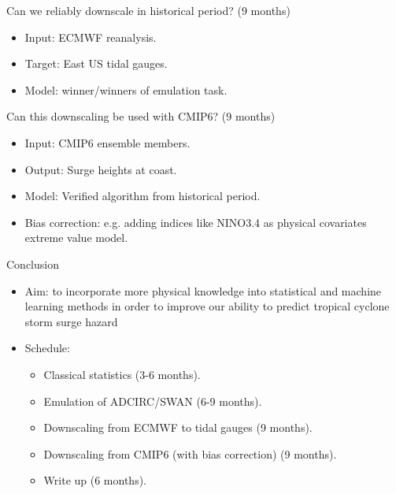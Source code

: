 \begin{frame}{Can we reliably downscale in historical period? (9 months)}

    \vspace{120pt}
\Large
\begin{itemize}
    \item Input: ECMWF reanalysis.
    \item Target: East US tidal gauges.
    \item Model: winner/winners of emulation task.
\end{itemize}
\end{frame}

\begin{frame}{Can this downscaling be used with CMIP6? (9 months)}

    \vspace{120pt}
\Large
    \begin{itemize}
    \item Input: CMIP6 ensemble members.
    \item Output: Surge heights at coast.
    \item Model: Verified algorithm from historical period.
    \item Bias correction: e.g. adding indices like NINO3.4 as physical covariates extreme value model.
    \end{itemize}
\end{frame}

\begin{frame}{Conclusion}
\Large
    \begin{itemize}
        \item Aim: to incorporate more physical knowledge into statistical and
         machine learning methods in order to improve our ability to
          predict tropical cyclone storm surge hazard
        \item Schedule:
    \begin{itemize}
        \item Classical statistics (3-6 months).
        \item Emulation of ADCIRC/SWAN (6-9 months).
        \item Downscaling from ECMWF to tidal gauges (9 months).
        \item Downscaling from CMIP6 (with bias correction) (9 months).
        \item Write up (6 months).
    \end{itemize}

\end{itemize}

\end{frame}


